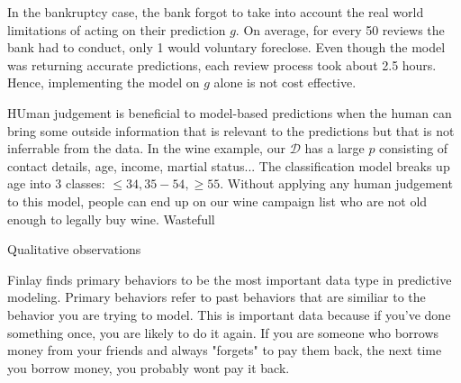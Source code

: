\documentclass[12pt]{article}
\begin{document}
\begin{enumerate}
In the bankruptcy case, the bank forgot to take into account the real world limitations of acting on their prediction $g$. On average, for every 50 reviews the bank had to conduct, only 1 would voluntary foreclose. Even though the model was returning accurate predictions, each review process took about 2.5 hours. Hence, implementing the model on $g$ alone is not cost effective.

HUman judgement is beneficial to model-based predictions when the human can bring some outside information that is relevant to the predictions but that is not inferrable from the data. In the wine example, our $\mathcal{D}$ has a large $p$ consisting of contact details, age, income, martial status... The classification model breaks up age into 3 classes: $\leq34, 35-54, \geq55$. Without applying any human judgement to this model, people can end up on our wine campaign list who are not old enough to legally buy wine. Wastefull\\





Qualitative observations

Finlay finds primary behaviors to be the most important data type in predictive modeling. Primary behaviors refer to past behaviors that are similiar to the behavior you are trying to model. This is important data because if you've done something once, you are likely to do it again. If you are someone who  borrows money from your friends and always "forgets" to pay them back, the next time you borrow money, you probably wont pay it back.


\end{enumerate}
\end{document}

